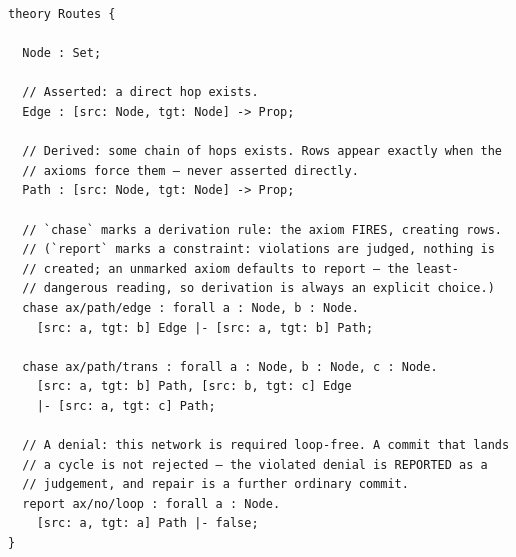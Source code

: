 \begin{Verbatim}[fontsize=\small,frame=leftline,rulecolor=\color{accentmid},framesep=3mm,xleftmargin=3mm]
theory Routes {

  Node : Set;

  // Asserted: a direct hop exists.
  Edge : [src: Node, tgt: Node] -> Prop;

  // Derived: some chain of hops exists. Rows appear exactly when the
  // axioms force them — never asserted directly.
  Path : [src: Node, tgt: Node] -> Prop;

  // `chase` marks a derivation rule: the axiom FIRES, creating rows.
  // (`report` marks a constraint: violations are judged, nothing is
  // created; an unmarked axiom defaults to report — the least-
  // dangerous reading, so derivation is always an explicit choice.)
  chase ax/path/edge : forall a : Node, b : Node.
    [src: a, tgt: b] Edge |- [src: a, tgt: b] Path;

  chase ax/path/trans : forall a : Node, b : Node, c : Node.
    [src: a, tgt: b] Path, [src: b, tgt: c] Edge
    |- [src: a, tgt: c] Path;

  // A denial: this network is required loop-free. A commit that lands
  // a cycle is not rejected — the violated denial is REPORTED as a
  // judgement, and repair is a further ordinary commit.
  report ax/no/loop : forall a : Node.
    [src: a, tgt: a] Path |- false;
}
\end{Verbatim}

